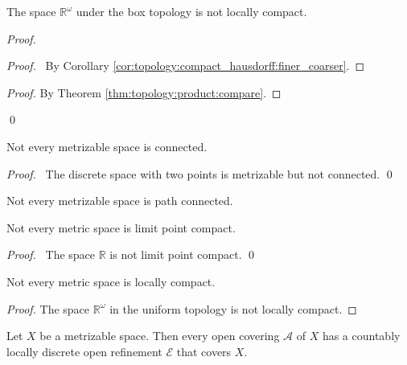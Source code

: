 \begin{prop}
  The space $\mathbb{R}^\omega$ under the box topology is not locally compact.
\end{prop}

\begin{proof}
  \pf
  \begin{proof}
    \pf\ By Corollary \ref{cor:topology:compact_hausdorff:finer_coarser}.
  \end{proof}
  \begin{proof}
    \pf By Theorem \ref{thm:topology:product:compare}.
  \end{proof}
  \qed
\end{proof}

\begin{prop}
  Not every metrizable space is connected.
\end{prop}

\begin{proof}
  \pf\ The discrete space with two points is metrizable but not connected. \qed
\end{proof}

\begin{cor}
  Not every metrizable space is path connected.
\end{cor}

\begin{prop}
  Not every metric space is limit point compact.
\end{prop}

\begin{proof}
  \pf\ The space $\mathbb{R}$ is not limit point compact. \qed
\end{proof}

\begin{prop}
  Not every metric space is locally compact.
\end{prop}

\begin{proof}
  The space $\mathbb{R}^\omega$ in the uniform topology is not locally compact.
\end{proof}

\begin{lm}[AC]
  \label{lm:topology:metric:locally_discrete_open_refinement}
  Let $X$ be a metrizable space. Then every open covering $\mathcal{A}$ of $X$ has a countably locally discrete open refinement $\mathcal{E}$ that covers $X$.
\end{lm}

